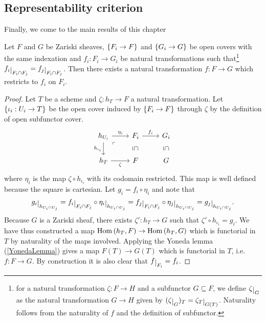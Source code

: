 \subsection{Representability criterion}
Finally, we come to the main results of this chapter

\begin{proposition}\label{MapGluingForZariskiSheaves}
Let $F$ and $G$ be Zariski sheaves, $\left\{{F_i\to F}\right\}$ and $\left\{{G_i\to G}\right\}$ be open covers with the same indexation and $f_i:F_i\to G_i$ be natural transformations such that\footnote{for a natural transformation $\zeta:F\to H$ and a subfunctor $G\subseteq F$, we define $\zeta\res G$ as the natural transformation $G\to H$ given by $(\zeta\res G)_T=\zeta_T\res{G(T)}$. Naturality follows from the naturality of $f$ and the definition of subfunctor.} $f_i\res{F_i\cap F_j}=f_j\res{F_i\cap F_j}$. 
Then there exists a natural transformation $f:F\to G$ which restricts to $f_i$ on $F_i$.
\end{proposition}
\begin{proof}
Let $T$ be a scheme and $\zeta:h_T\to F$ a natural transformation. Let $\left\{{\iota_i:U_i\to T}\right\}$ be the open cover induced by $\left\{{F_i\to F}\right\}$ through $\zeta$ by the definition of open subfunctor cover.
\[\begin{tikzcd}
	{h_{U_i}} & {F_i} & {G_i} \\
	{h_T} & F & G
	\arrow["{\eta_i}", from=1-1, to=1-2]
	\arrow["{h_{\iota_i}}"', from=1-1, to=2-1]
	\arrow["\ulcorner"{anchor=center, pos=0.125}, draw=none, from=1-1, to=2-2]
	\arrow["{f_i}", from=1-2, to=1-3]
	\arrow["\subseteq"{marking, allow upside down}, draw=none, from=1-2, to=2-2]
	\arrow["\subseteq"{marking, allow upside down}, draw=none, from=1-3, to=2-3]
	\arrow["\zeta"', from=2-1, to=2-2]
\end{tikzcd}\]
where $\eta_i$ is the map $\zeta\circ h_{\iota_i}$ with its codomain restricted. This map is well defined because the square is cartesian.
Let $g_i=f_i\circ \eta_i$ and note that
\[g_i\res{h_{U_i\cap U_j}}=f_i\res{F_i\cap F_j}\circ \eta_i \res{h_{U_i\cap U_j}}=f_j\res{F_i\cap F_j}\circ \eta_j\res{h_{U_i\cap U_j}}=g_j\res{h_{U_i\cap U_j}}.\]
Because $G$ is a Zariski sheaf, there exists $\zeta':h_T\to G$ such that $\zeta'\circ h_{\iota_i}=g_i$. We have thus constructed a map $\mathrm{Hom}\,(h_T,F)\to \mathrm{Hom}\,(h_T,G)$ which is functorial in $T$ by naturality of the maps involved. Applying the Yoneda lemma (\ref{YonedaLemma}) gives a map $F(T)\to G(T)$ which is functorial in $T$, i.e. $f:F\to G$. By construction it is also clear that $f\res{F_i}=f_i$.
\end{proof}
